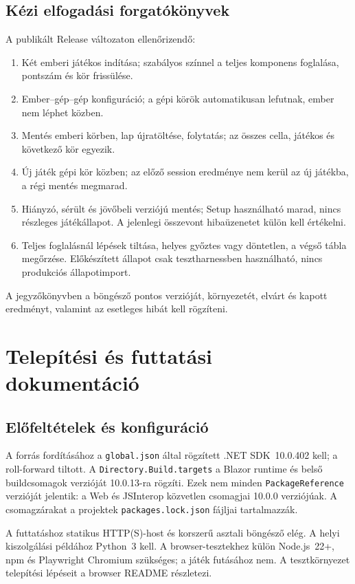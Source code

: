 \documentclass[11pt,a4paper]{article}
\newcommand{\code}[1]{\nolinkurl{#1}}
\begin{document}
\subsection{Kézi elfogadási forgatókönyvek}
A publikált Release változaton ellenőrizendő:
\begin{enumerate}
\item Két emberi játékos indítása; szabályos színnel a teljes komponens foglalása, pontszám és kör frissülése.
\item Ember--gép--gép konfiguráció; a gépi körök automatikusan lefutnak, ember nem léphet közben.
\item Mentés emberi körben, lap újratöltése, folytatás; az összes cella, játékos és következő kör egyezik.
\item Új játék gépi kör közben; az előző session eredménye nem kerül az új játékba, a régi mentés megmarad.
\item Hiányzó, sérült és jövőbeli verziójú mentés; Setup használható marad, nincs részleges játékállapot. A jelenlegi összevont hibaüzenetet külön kell értékelni.
\item Teljes foglalásnál lépések tiltása, helyes győztes vagy döntetlen, a végső tábla megőrzése. Előkészített állapot csak tesztharnessben használható, nincs produkciós állapotimport.
\end{enumerate}
A jegyzőkönyvben a böngésző pontos verzióját, környezetét, elvárt és kapott eredményt, valamint az esetleges hibát kell rögzíteni.

\section{Telepítési és futtatási dokumentáció}
\subsection{Előfeltételek és konfiguráció}
A forrás fordításához a \code{global.json} által rögzített .NET SDK~10.0.402 kell; a roll-forward tiltott. A \code{Directory.Build.targets} a Blazor runtime és belső buildcsomagok verzióját 10.0.13-ra rögzíti. Ezek nem minden \code{PackageReference} verzióját jelentik: a Web és JSInterop közvetlen csomagjai 10.0.0 verziójúak. A csomagzárakat a projektek \code{packages.lock.json} fájljai tartalmazzák.

A futtatáshoz statikus HTTP(S)-host és korszerű asztali böngésző elég. A helyi kiszolgálási példához Python~3 kell. A browser-tesztekhez külön Node.js~22+, npm és Playwright Chromium szükséges; a játék futásához nem. A tesztkörnyezet telepítési lépéseit a browser README részletezi.
\end{document}
